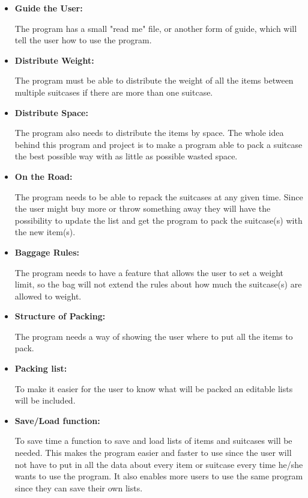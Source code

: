 \begin{itemize}
\item \textbf{Guide the User:}

The program has a small "read me" file, or another form of guide, which will tell the user how to use the program.

\item \textbf{Distribute Weight:}

The program must be able to distribute the weight of all the items between multiple suitcases if there are more than one suitcase.

\item \textbf{Distribute Space:}

The program also needs to distribute the items by space. The whole idea behind this program and project is to make a program able to pack a suitcase the best possible way with as little as possible wasted space.

\item \textbf{On the Road:}

The program needs to be able to repack the suitcases at any given time. Since the user might buy more or throw something away they will have the possibility to update the list and get the program to pack the suitcase(s) with the new item(s).

\item \textbf{Baggage Rules:}

The program needs to have a feature that allows the user to set a weight limit, so the bag will not extend the rules about how much the suitcase(s) are allowed to weight.

\item \textbf{Structure of Packing:}

The program needs a way of showing the user where to put all the items to pack.

\item \textbf{Packing list:}

To make it easier for the user to know what will be packed an editable lists will be included.

\item \textbf{Save/Load function:}

To save time a function to save and load lists of items and suitcases will be needed. This makes the program easier and faster to use since the user will not have to put in all the data about every item or suitcase every time he/she wants to use the program. It also enables more users to use the same program since they can save their own lists.
\end{itemize}

